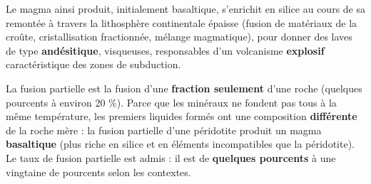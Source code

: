 \documentclass[11pt]{article}
\newcommand{\cle}[1]{{\popxbold\color{popdark}#1}}
\begin{document}
Le magma ainsi produit, initialement basaltique, s'enrichit en silice au cours de sa remontée à travers la lithosphère continentale épaisse (fusion de matériaux de la croûte, cristallisation fractionnée, mélange magmatique), pour donner des laves de type \textbf{andésitique}, visqueuses, responsables d'un volcanisme \textbf{explosif} caractéristique des zones de subduction.

\begin{definition}
La \cle{fusion partielle} est la fusion d'une \textbf{fraction seulement} d'une roche (quelques pourcents à environ 20 \%). Parce que les minéraux ne fondent pas tous à la même température, les premiers liquides formés ont une composition \textbf{différente} de la roche mère : la fusion partielle d'une péridotite produit un magma \textbf{basaltique} (plus riche en silice et en éléments incompatibles que la péridotite). Le taux de fusion partielle est admis : il est de \textbf{quelques pourcents} à une vingtaine de pourcents selon les contextes.
\end{definition}
\end{document}
